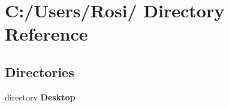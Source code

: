 \section{C:/Users/Rosi/ Directory Reference}
\label{dir_C_3A_2FUsers_2FRosi_2F}


\subsection*{Directories}
\begin{CompactItemize}
\item 
directory {\bf Desktop}
\end{CompactItemize}
